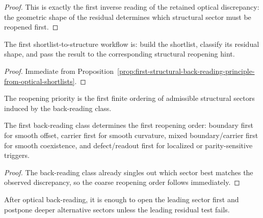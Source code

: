 \begin{proof}
This is exactly the first inverse reading of the retained optical discrepancy: the geometric shape of the residual determines which structural sector must be reopened first.
\end{proof}

\begin{corollary}
\label{cor:first-workflow-from-optical-shortlist-to-structural-diagnostic-hint}
The first shortlist-to-structure workflow is: build the shortlist, classify its residual shape, and pass the result to the corresponding structural reopening hint.
\end{corollary}

\begin{proof}
Immediate from Proposition~\ref{prop:first-structural-back-reading-principle-from-optical-shortlists}.
\end{proof}

\begin{definition}
\label{def:structural-diagnostic-reopening-priority}
The reopening priority is the first finite ordering of admissible structural sectors induced by the back-reading class.
\end{definition}

\begin{proposition}
\label{prop:first-diagnostic-reopening-priority-principle-from-optical-back-reading}
The first back-reading class determines the first reopening order: boundary first for smooth offset, carrier first for smooth curvature, mixed boundary/carrier first for smooth coexistence, and defect/readout first for localized or parity-sensitive triggers.
\end{proposition}

\begin{proof}
The back-reading class already singles out which sector best matches the observed discrepancy, so the coarse reopening order follows immediately.
\end{proof}

\begin{corollary}
\label{cor:first-refinement-workflow-after-optical-back-reading}
After optical back-reading, it is enough to open the leading sector first and postpone deeper alternative sectors unless the leading residual test fails.
\end{corollary}


